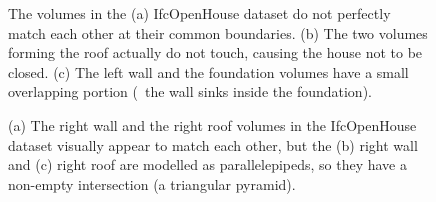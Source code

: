 \begin{figure}[tbp]
\enspace%
\enspace%
\caption[The volumes in the IfcOpenHouse dataset do not fit together]{The volumes in the (a) IfcOpenHouse dataset do not perfectly match each other at their common boundaries.
(b) The two volumes forming the roof actually do not touch, causing the house not to be closed.
(c) The left wall and the foundation volumes have a small overlapping portion (\ie\ the wall sinks inside the foundation).}
\label{fig:ioh-small}
\end{figure}

\begin{figure}[tbp]
\enspace%
\enspace%
\caption[A large overlap in the IfcOpenHouse dataset]{(a) The right wall and the right roof volumes in the IfcOpenHouse dataset visually appear to match each other, but the (b) right wall and (c) right roof are modelled as parallelepipeds, so they have a non-empty intersection (a triangular pyramid).}
\label{fig:ioh-large}
\end{figure}

